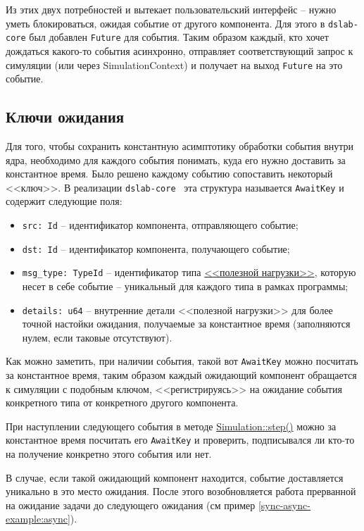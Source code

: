 Из этих двух потребностей и вытекает пользовательский интерфейс -- нужно уметь блокироваться, ожидая событие от другого компонента. Для этого в \texttt{dslab-core} был добавлен \texttt{Future} для события. Таким образом каждый, кто хочет дождаться какого-то события асинхронно, отправляет соответствующий запрос к симуляции (или через SimulationContext) и получает на выход \texttt{Future} на это событие. 

\subsection{Ключи ожидания} \label{awaitkey}

Для того, чтобы сохранить константную асимптотику обработки события внутри ядра, необходимо для каждого события понимать, куда его нужно доставить за константное время. Было решено каждому событию сопоставить некоторый <<ключ>>. В реализации \texttt{dslab-core}~\cite{async-dslab-core} эта структура называется \texttt{AwaitKey} и содержит следующие поля: 
\begin{itemize}
    \item \texttt{src: Id} -- идентификатор компонента, отправляющего событие;
    \item \texttt{dst: Id} -- идентификатор компонента, получающего событие;
    \item \texttt{msg\_type: TypeId} -- идентификатор типа \hyperref[Event:payload]{<<полезной нагрузки>>}, которую несет в себе событие -- уникальный для каждого типа в рамках программы;
    \item \texttt{details: u64} -- внутренние детали <<полезной нагрузки>> для более точной настойки ожидания, получаемые за константное время (заполняются нулем, если таковые отсутствуют).
\end{itemize}  

Как можно заметить, при наличии события, такой вот \texttt{AwaitKey} можно посчитать за константное время, таким образом каждый ожидающий компонент обращается к симуляции с подобным ключом, <<регистрируясь>> на ожидание события конкретного типа от конкретного другого компонента.

При наступлении следующего события в методе \hyperref[Simulation::step]{Simulation::step()} можно за константное время посчитать его \texttt{AwaitKey} и проверить, подписывался ли кто-то на получение конкретно этого события или нет. 

В случае, если такой ожидающий компонент находится, событие доставляется уникально в это место ожидания. После этого возобновляется работа прерванной на ожидание задачи до следующего ожидания (см пример \ref{sync-async-example:async}).

